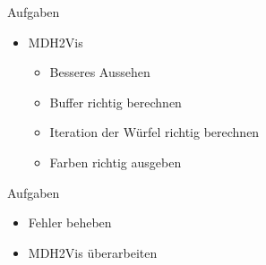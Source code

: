 \documentclass{../presentation}
\begin{document}
\frame[plain]{\titlepage}

\begin{frame}{Aufgaben}
    \begin{itemize}
        \item MDH2Vis
        
        \begin{itemize}
            \item Besseres Aussehen
            \item Buffer richtig berechnen
            \item Iteration der Würfel richtig berechnen
            \item Farben richtig ausgeben
        \end{itemize}
    \end{itemize}
\end{frame}

\begin{frame}{Aufgaben}
    \begin{itemize}
        \item Fehler beheben
        \item MDH2Vis überarbeiten
    \end{itemize}
\end{frame}
\end{document}
